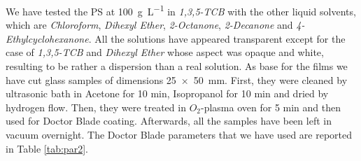 \documentclass  [
  paper    = a4,
  BCOR     = 10mm,
  twoside,
  fontsize = 12pt,
  fleqn,
  toc      = bibnumbered,
  toc      = listofnumbered,
  numbers  = noendperiod,
  headings = normal,
  listof   = leveldown,
  version  = 3.03
]                                       {scrreprt}
\begin{document}
We have tested the PS at \SI[per-mode=symbol]{100}{\gram\per\liter} in \emph{1,3,5-TCB} with the other liquid solvents, which are \emph{Chloroform}, \emph{Dihexyl Ether}, \emph{2-Octanone}, \emph{2-Decanone} and \emph{4-Ethylcyclohexanone}. All the solutions have appeared transparent except for the case of \emph{1,3,5-TCB} and \emph{Dihexyl Ether} whose aspect was opaque and white, resulting to be rather a dispersion than a real solution. As base for the films we have cut glass samples of dimensions \SI{25x50}{\milli\metre}. First, they were cleaned by ultrasonic bath in Acetone for 10 min, Isopropanol for 10 min and dried by hydrogen flow. Then, they were treated in $O_2$-plasma oven for 5 min and then used for Doctor Blade coating. Afterwards, all the samples have been left in vacuum overnight. The Doctor Blade parameters that we have used are reported in Table \ref{tab:par2}.\\
\end{document}
